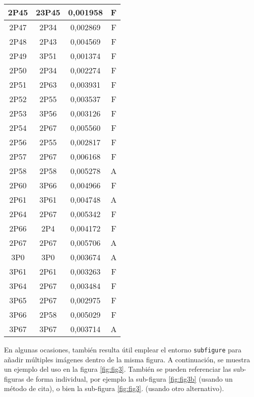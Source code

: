 \begin{center}
\begin{longtable}{|c|c|c|c|}
    \hline	2P45	&	23P45	&	0,001958	&	F	\\
    \hline	2P47	&	2P34	&	0,002869	&	F	\\
    \hline	2P48	&	2P43	&	0,004569	&	F	\\
    \hline	2P49	&	3P51	&	0,001374	&	F	\\
    \hline	2P50	&	2P34	&	0,002274	&	F	\\
    \hline	2P51	&	2P63	&	0,003931	&	F	\\
    \hline	2P52	&	2P55	&	0,003537	&	F	\\
    \hline	2P53	&	3P56	&	0,003126	&	F	\\
    \hline	2P54	&	2P67	&	0,005560	&	F	\\
    \hline	2P56	&	2P55	&	0,002817	&	F	\\
    \hline	2P57	&	2P67	&	0,006168	&	F	\\
    \hline	2P58	&	2P58	&	0,005278	&	A	\\
    \hline	2P60	&	3P66	&	0,004966	&	F	\\
    \hline	2P61	&	3P61	&	0,004748	&	A	\\
    \hline	2P64	&	2P67	&	0,005342	&	F	\\
    \hline	2P66	&	2P4	&	0,004172	&	F	\\
    \hline	2P67	&	2P67	&	0,005706	&	A	\\
    \hline	3P0	&	3P0	&	0,003674	&	A	\\
    \hline	3P61	&	2P61	&	0,003263	&	F	\\
    \hline	3P64	&	2P67	&	0,003484	&	F	\\
    \hline	3P65	&	2P67	&	0,002975	&	F	\\
    \hline	3P66	&	2P58	&	0,005029	&	F	\\
    \hline	3P67	&	3P67	&	0,003714	&	A	\\
	\end{longtable}
\end{center}

En algunas ocasiones, también resulta útil emplear el entorno
\texttt{subfigure} para añadir múltiples imágenes dentro de la misma
figura. A continuación, se muestra un ejemplo del uso en la figura
\ref{fig:fig3}. También se pueden referenciar las sub-figuras de forma
individual, por ejemplo la sub-figura \ref{fig:fig3b} (usando un método
de cita), o bien la sub-figura \ref{fig:fig3}. (usando
otro alternativo).


